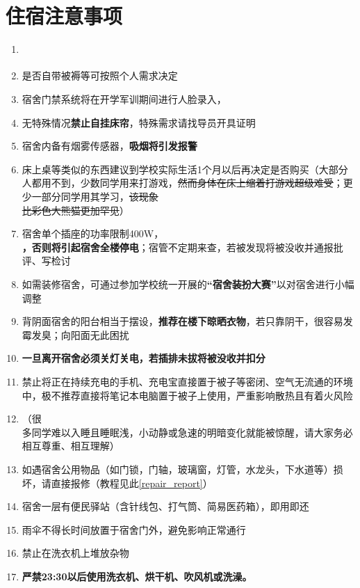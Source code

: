 \section[住宿注意事项]{住宿注意事项}
\begin{enumerate}
      \item \textbf{}
            \label{random_allocation}
      \item 是否自带被褥等可按照个人需求决定\footnotemark
      \item 宿舍门禁系统将在开学军训期间进行人脸录入，\textbf{}
      \item 无特殊情况\textbf{禁止自挂床帘}，特殊需求请找导员开具证明
      \item 宿舍内备有烟雾传感器，\textbf{吸烟将引发报警}
      \item 床上桌等类似的东西建议到学校实际生活1个月以后再决定是否购买（大部分人都用不到，少数同学用来打游戏，\sout{然而身体在床上缩着打游戏超级难受}；更少一部分同学用其学习，\sout{该现象\\比彩色大熊猫更加罕见}）
      \item 宿舍单个插座的功率限制400W\footnotemark，\textbf{}\\\textbf{，否则将引起宿舍全楼停电}；宿管不定期来查，若被发现将被没收并通报批评、写检讨
      \item 如需装修宿舍，可通过参加学校统一开展的\textbf{“宿舍装扮大赛”}\footnotemark 以对宿舍进行小幅调整
      \item 背阴面宿舍的阳台相当于摆设，\textbf{推荐在楼下晾晒衣物}，若只靠阴干，很容易发霉发臭；向阳面无此困扰
      \item \textbf{一旦离开宿舍必须关灯关电，若插排未拔将被没收并扣分}
      \item 禁止将正在持续充电的手机、充电宝直接置于被子等密闭、空气无流通的环境中，极不推荐直接将笔记本电脑置于被子上使用，严重影响散热且有着火风险
      \item \textbf{}（很\\多同学难以入睡且睡眠浅，小动静或急速的明暗变化就能被惊醒，请大家务必相互尊重、相互理解）
      \item 如遇宿舍公用物品（如门锁，门轴，玻璃窗，灯管，水龙头，下水道等）损坏，请直接报修（教程见此\uline{\ref{repair_report}}）
      \item 宿舍一层有便民驿站（含针线包、打气筒、简易医药箱），即用即还
      \item 雨伞不得长时间放置于宿舍门外，避免影响正常通行
      \item 禁止在洗衣机上堆放杂物
      \item \textbf{严禁23:30以后使用洗衣机、烘干机、吹风机或洗澡。}
\end{enumerate}

